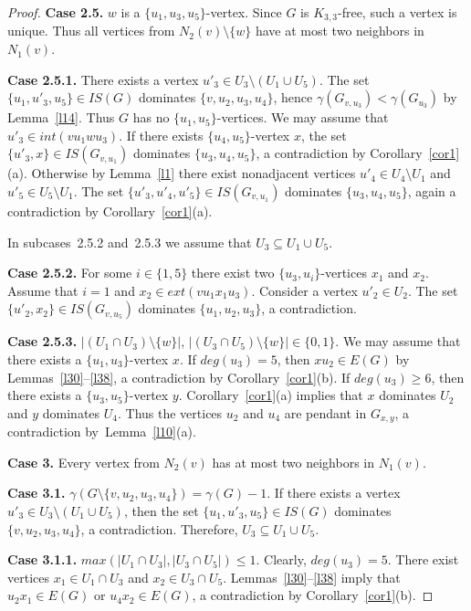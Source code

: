 \documentclass[12pt]{article}
\begin{document}
\begin{proof}
\textbf{Case 2.5.} $w$ is a $\{u_1,u_3,u_5\}$-vertex. Since $G$ is $K_{3,3}$-free, such a vertex is unique. Thus all vertices from $N_2(v) \setminus \{w\}$ have at most two neighbors in $N_1(v)$.

\textbf{Case 2.5.1.} There exists a vertex $u'_3 \in U_3 \setminus (U_1 \cup U_5)$. The set $\{u_1,u'_3,u_5\} \in IS(G)$ dominates $\{v,u_2,u_3,u_4\}$, hence $\gamma(G_{v,u_3}) < \gamma(G_{u_3})$ by Lemma~\ref{l14}. Thus $G$ has no $\{u_1,u_5\}$-vertices. We may assume that $u'_3 \in int(vu_1wu_3)$. If there exists $\{u_4,u_5\}$-vertex $x$, the set $\{u'_3,x\} \in IS(G_{v,u_1})$ dominates $\{u_3,u_4,u_5\}$, a contradiction by Corollary~\ref{cor1}(a). Otherwise by Lemma~\ref{l1} there exist nonadjacent vertices $u'_4 \in U_4 \setminus U_1$ and $u'_5 \in U_5 \setminus U_1$. The set $\{u'_3,u'_4,u'_5\} \in IS(G_{v,u_1})$ dominates $\{u_3,u_4,u_5\}$, again a contradiction by Corollary~\ref{cor1}(a).

In subcases~2.5.2 and~2.5.3 we assume that $U_3 \subseteq U_1 \cup U_5$.

\textbf{Case 2.5.2.}  For some $i \in \{1,5\}$ there exist two $\{u_3,u_i\}$-vertices $x_1$ and $x_2$. Assume that $i = 1$ and $x_2 \in ext(vu_1x_1u_3)$. Consider a vertex $u'_2 \in U_2$. The set $\{u'_2,x_2\} \in IS(G_{v,u_5})$ dominates $\{u_1,u_2,u_3\}$, a contradiction. 

\textbf{Case 2.5.3.} $|(U_1 \cap U_3) \setminus \{w\}|$, $|(U_3 \cap U_5) \setminus \{w\}| \in \{0,1\}$. We may assume that there exists a $\{u_1,u_3\}$-vertex $x$. If $deg(u_3) = 5$,  then $xu_2 \in E(G)$ by Lemmas~\ref{l30}--\ref{l38}, a contradiction by Corollary~\ref{cor1}(b). If $deg(u_3) \geq 6$, then there exists a $\{u_3,u_5\}$-vertex $y$. Corollary~\ref{cor1}(a) implies that $x$ dominates $U_2$ and $y$ dominates $U_4$. Thus the vertices $u_2$ and $u_4$ are pendant in $G_{x,y}$, a contradiction by~Lemma~\ref{l10}(a).

\textbf{Case 3.} Every vertex from $N_2(v)$ has at most two neighbors in $N_1(v)$.

\textbf{Case 3.1.} $\gamma(G \setminus \{v,u_2,u_3,u_4\}) = \gamma(G) - 1$. If there exists a vertex $u'_3 \in U_3 \setminus (U_1 \cup U_5)$, then the set $\{u_1,u'_3,u_5\} \in IS(G)$ dominates $\{v,u_2,u_3,u_4\}$, a contradiction. Therefore, $U_3 \subseteq U_1 \cup U_5$. 

\textbf{Case 3.1.1.} $max(|U_1 \cap U_3|,|U_3 \cap U_5|) \leq 1$. Clearly, $deg(u_3) = 5$. There exist vertices $x_1 \in U_1 \cap U_3$ and $x_2 \in U_3 \cap U_5$. Lemmas~\ref{l30}--\ref{l38} imply that $u_2x_1 \in E(G)$ or $u_4x_2 \in E(G)$, a contradiction by Corollary~\ref{cor1}(b).


\end{proof}
\end{document}
